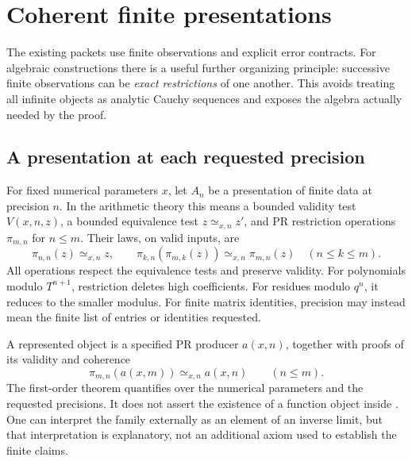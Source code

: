 \section{Coherent finite presentations}
\label{sec:refinement}

The existing packets use finite observations and explicit error contracts.
For algebraic constructions there is a useful further organizing principle:
successive finite observations can be \emph{exact restrictions} of one
another. This avoids treating all infinite objects as analytic Cauchy
sequences and exposes the algebra actually needed by the proof.

\subsection{A presentation at each requested precision}

For fixed numerical parameters \(x\), let \(A_n\) be a presentation of
finite data at precision \(n\). In the arithmetic theory this means a
bounded validity test \(V(x,n,z)\), a bounded equivalence test
\(z\simeq_{x,n}z'\), and PR restriction operations
\(\pi_{m,n}\) for \(n\le m\). Their laws, on valid inputs, are
\[
 \pi_{n,n}(z)\simeq_{x,n}z,\qquad
 \pi_{k,n}(\pi_{m,k}(z))\simeq_{x,n}\pi_{m,n}(z)
 \quad(n\le k\le m).
\]
All operations respect the equivalence tests and preserve validity.
For polynomials modulo \(T^{n+1}\), restriction deletes high
coefficients. For residues modulo \(q^n\), it reduces to the smaller
modulus. For finite matrix identities, precision may instead mean the
finite list of entries or identities requested.

A represented object is a specified PR producer \(a(x,n)\), together
with proofs of its validity and coherence
\[
 \pi_{m,n}(a(x,m))\simeq_{x,n}a(x,n)\qquad(n\le m).
\]
The first-order theorem quantifies over the numerical parameters and the
requested precisions. It does not assert the existence of a function
object inside \ipra. One can interpret the family externally as an
element of an inverse limit, but that interpretation is explanatory, not
an additional axiom used to establish the finite claims.

